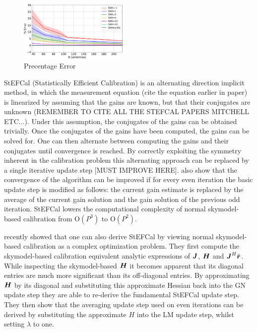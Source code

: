 \documentclass[useAMS,usenatbib]{mn2e}
\newcommand{\br}{\bmath{r}}
\newcommand{\bJ}{\bmath{J}}
\newcommand{\bH}{\bmath{H}}
\begin{document}
\begin{figure}
\includegraphics[width=0.47\textwidth]{./prec_error.pdf} 
\caption{Precentage Error}
\label{fig:prec_error}
\end{figure} 

StEFCal (Statistically Efficient Calibration) is an alternating direction implicit method, in which the measurement equation (cite the equation earlier in paper) is linearized by assuming that the gains are known, but
that their conjugates are unknown (REMEMBER TO CITE ALL THE STEFCAL PAPERS MITCHELL ETC...). Under this assumption, the conjugates of the gains can be obtained trivially. Once the conjugates of the gains have been computed, the gains can be solved for. One can then alternate between computing the gains and their conjugates until convergence
is reached. By correctly exploiting the symmetry inherent in the calibration problem this alternating approach can be replaced by a single iterative update step [MUST IMPROVE HERE]. \cite{Salvini2014} also show that
the convergence of the algorithm can be improved if for every even iteration the basic update step is modified as follows: the current gain estimate is replaced by the average of the current gain solution and the gain solution of the previous odd iteration.
StEFCal lowers the computational complexity of normal skymodel-based calibration from O$(P^3)$ to O$(P^2)$. 

\citet{Smirnov2015} recently showed that one can also derive StEFCal by viewing normal skymodel-based calibration as a complex optimization problem. They first compute the skymodel-based calibration equivalent analytic expressions of $\bJ$,
$\bH$ and $\bJ^H\breve{\br}$. While inspecting the skymodel-based $\bH$ it becomes apparent that its diagonal entries are much more significant than its off-diagonal entries.
By approximating $\bH$ by its diagonal and substituting this approximate Hessian back into the GN update step they are able to re-derive the fundamental StEFCal update step. They then show that the 
averaging update step used on even iterations can be derived by substituting the approximate $H$ into the LM update step, whilst setting $\lambda$ to one.
\end{document}

